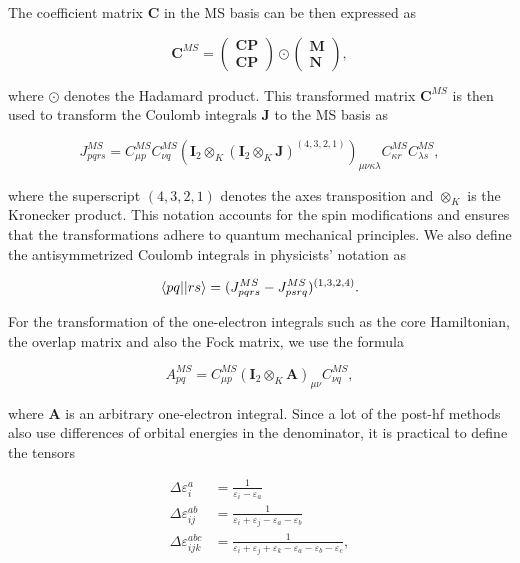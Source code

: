 The coefficient matrix \(\mathbf{C}\) in the MS basis can be then expressed as

\begin{equation}
\mathbf{C}^{MS}=
\begin{pmatrix}
\mathbf{CP} \\
\mathbf{CP}
\end{pmatrix}
\odot
\begin{pmatrix}
\mathbf{M} \\
\mathbf{N}
\end{pmatrix}
,
\end{equation}

where \(\odot\) denotes the Hadamard product. This transformed matrix \(\mathbf{C}^{MS}\) is then used to transform the Coulomb integrals \(\mathbf{J}\) to the MS basis as

\begin{equation}
J_{pqrs}^{MS}=C_{\mu p}^{MS}C_{\nu q}^{MS}(\mathbf{I}_{2}\otimes_K(\mathbf{I}_{2}\otimes_K\mathbf{J})^{(4,3,2,1)})_{\mu\nu\kappa\lambda}C_{\kappa r}^{MS}C_{\lambda s}^{MS},
\end{equation}

where the superscript \((4,3,2,1)\) denotes the axes transposition and \(\otimes_K\) is the Kronecker product. This notation accounts for the spin modifications and ensures that the transformations adhere to quantum mechanical principles. We also define the antisymmetrized Coulomb integrals in physicists' notation as

\begin{equation}
\braket{pq||rs}=(J_{pqrs}^{MS}-J_{psrq}^{MS})^{(1,3,2,4)}.
\end{equation}

For the transformation of the one-electron integrals such as the core Hamiltonian, the overlap matrix and also the Fock matrix, we use the formula

\begin{equation}
A_{pq}^{MS}=C_{\mu p}^{MS}(\mathbf{I}_{2}\otimes_K\mathbf{A})_{\mu\nu}C_{\nu q}^{MS},
\end{equation}

where \(\mathbf{A}\) is an arbitrary one-electron integral. Since a lot of the \acrshort{post-hf} methods also use differences of orbital energies in the denominator, it is practical to define the tensors

\begin{align}
\Delta\varepsilon^{a}_{i}&=\frac{1}{\varepsilon_i-\varepsilon_a} \\
\Delta\varepsilon^{ab}_{ij}&=\frac{1}{\varepsilon_i+\varepsilon_j-\varepsilon_a-\varepsilon_b} \\
\Delta\varepsilon^{abc}_{ijk}&=\frac{1}{\varepsilon_i+\varepsilon_j+\varepsilon_k-\varepsilon_a-\varepsilon_b-\varepsilon_c},
\end{align}

